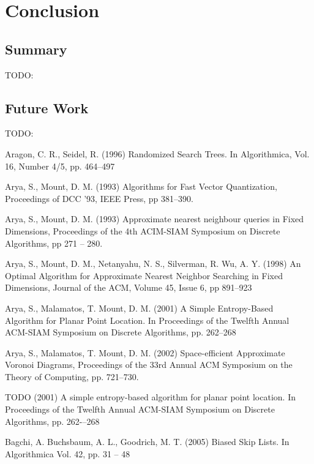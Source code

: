 \documentclass[mcs]{scsthesis}
\begin{document}
\chapter{Conclusion}

\section{Summary}

TODO:

\section{Future Work}

TODO:

\begin{thebibliography}{5}

Aragon, C. R.,  Seidel, R. (1996) Randomized Search Trees.
In Algorithmica, Vol. 16, Number 4/5, pp. 464--497

Arya, S., Mount, D. M. (1993) Algorithms for Fast Vector Quantization,
Proceedings of DCC '93, IEEE Press, pp 381--390. 

Arya, S., Mount, D. M. (1993) Approximate nearest neighbour queries in Fixed
Dimensions, Proceedings of the 4th ACIM-SIAM Symposium on Discrete Algorithms,
pp 271 -- 280.

Arya, S., Mount, D. M., Netanyahu, N. S., Silverman, R. Wu, A. Y. (1998)
An Optimal Algorithm for Approximate Nearest Neighbor Searching in Fixed
Dimensions, Journal of the ACM, Volume 45, Issue 6, pp 891--923

Arya, S., Malamatos, T. Mount, D. M. (2001) A Simple Entropy-Based Algorithm
for Planar Point Location. In Proceedings of the Twelfth Annual ACM-SIAM
Symposium on Discrete Algorithms, pp. 262--268

Arya, S., Malamatos, T. Mount, D. M. (2002) Space-efficient Approximate
Voronoi Diagrams, Proceedings of the 33rd Annual ACM Symposium on the Theory
of Computing, pp. 721--730.

TODO (2001) A simple entropy-based algorithm for planar point location.
In Proceedings of the Twelfth Annual ACM-SIAM Symposium on Discrete Algorithms,
pp. 262-–268

Bagchi, A. Buchsbaum, A. L., Goodrich, M. T. (2005) Biased Skip Lists.
In Algorithmica Vol. 42, pp. 31 – 48


\end{thebibliography}
\end{document}

